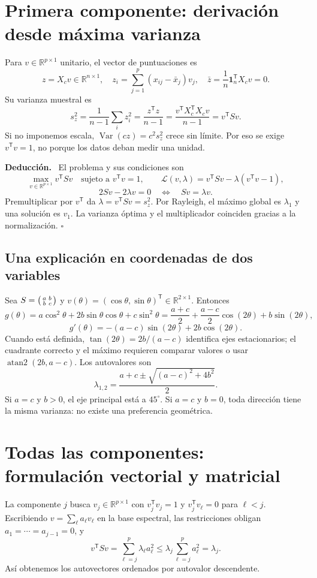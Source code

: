 \documentclass[11pt,a4paper]{article}
\newcommand{\R}{\mathbb R}
\newcommand{\T}{^{\mathsf T}}
\DeclareMathOperator{\Var}{Var}
\newenvironment{deduccion}{\par\textbf{Deducción.}\ }{\hfill$\square$\par}
\newcommand{\ones}{\mathbf 1}
\theoremstyle{definition}
\begin{document}
\section{Primera componente: derivación desde máxima varianza}
Para $v\in\R^{p\times1}$ unitario, el vector de puntuaciones es
\[
z=X_cv\in\R^{n\times1},\quad z_i=\sum_{j=1}^p(x_{ij}-\bar x_j)v_j,
\quad\bar z=\frac1n\ones_n\T X_cv=0.
\]
Su varianza muestral es
\[
s_z^2=\frac1{n-1}\sum_i z_i^2=\frac{z\T z}{n-1}
=\frac{v\T X_c\T X_cv}{n-1}=v\T Sv.
\]
Si no imponemos escala, $\Var(cz)=c^2s_z^2$ crece sin límite. Por eso se exige $v\T v=1$, no porque los datos deban medir una unidad.
\begin{deduccion}
El problema y sus condiciones son
\[
\max_{v\in\R^{p\times1}}v\T Sv\quad\text{sujeto a }v\T v=1,\qquad
\mathcal L(v,\lambda)=v\T Sv-\lambda(v\T v-1),
\]
\[
2Sv-2\lambda v=0\quad\Longleftrightarrow\quad Sv=\lambda v.
\]
Premultiplicar por $v\T$ da $\lambda=v\T Sv=s_z^2$. Por Rayleigh, el máximo global es $\lambda_1$ y una solución es $v_1$. La varianza óptima y el multiplicador coinciden gracias a la normalización.
\end{deduccion}
\subsection{Una explicación en coordenadas de dos variables}
Sea $S=\begin{psmallmatrix}a&b\\b&c\end{psmallmatrix}$ y $v(\theta)=(\cos\theta,\sin\theta)\T\in\R^{2\times1}$. Entonces
\[
g(\theta)=a\cos^2\theta+2b\sin\theta\cos\theta+c\sin^2\theta
=\frac{a+c}2+\frac{a-c}2\cos(2\theta)+b\sin(2\theta),
\]
\[
g'(\theta)=-(a-c)\sin(2\theta)+2b\cos(2\theta).
\]
Cuando está definida, $\tan(2\theta)=2b/(a-c)$ identifica ejes estacionarios; el cuadrante correcto y el máximo requieren comparar valores o usar $\operatorname{atan2}(2b,a-c)$. Los autovalores son
\[
\lambda_{1,2}=\frac{a+c\pm\sqrt{(a-c)^2+4b^2}}2.
\]
Si $a=c$ y $b>0$, el eje principal está a $45^\circ$. Si $a=c$ y $b=0$, toda dirección tiene la misma varianza: no existe una preferencia geométrica.

\section{Todas las componentes: formulación vectorial y matricial}
La componente $j$ busca $v_j\in\R^{p\times1}$ con $v_j\T v_j=1$ y $v_j\T v_\ell=0$ para $\ell<j$. Escribiendo $v=\sum_\ell a_\ell v_\ell$ en la base espectral, las restricciones obligan $a_1=\cdots=a_{j-1}=0$, y
\[
v\T Sv=\sum_{\ell=j}^p\lambda_\ell a_\ell^2\le\lambda_j\sum_{\ell=j}^pa_\ell^2=\lambda_j.
\]
Así obtenemos los autovectores ordenados por autovalor descendente.
\end{document}
